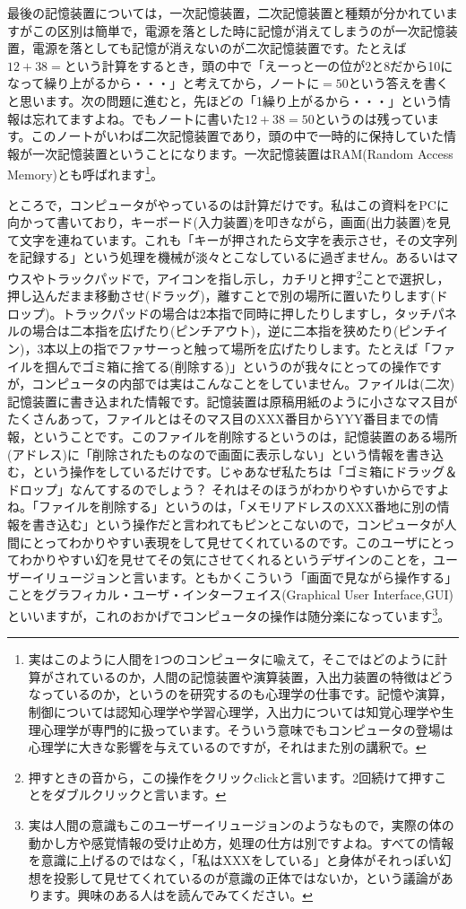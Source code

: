 \documentclass{ltjsbook}
\begin{document}
最後の記憶装置については，一次記憶装置，二次記憶装置と種類が分かれていますがこの区別は簡単で，電源を落とした時に記憶が消えてしまうのが一次記憶装置，電源を落としても記憶が消えないのが二次記憶装置です。たとえば$12+38=$という計算をするとき，頭の中で「えーっと一の位が2と8だから10になって繰り上がるから・・・」と考えてから，ノートに$=50$という答えを書くと思います。次の問題に進むと，先ほどの「1繰り上がるから・・・」という情報は忘れてますよね。でもノートに書いた$12+38=50$というのは残っています。このノートがいわば二次記憶装置であり，頭の中で一時的に保持していた情報が一次記憶装置ということになります。一次記憶装置はRAM(Random Access Memory)とも呼ばれます\footnote{実はこのように人間を1つのコンピュータに喩えて，そこではどのように計算がされているのか，人間の記憶装置や演算装置，入出力装置の特徴はどうなっているのか，というのを研究するのも心理学の仕事です。記憶や演算，制御については認知心理学や学習心理学，入出力については知覚心理学や生理心理学が専門的に扱っています。そういう意味でもコンピュータの登場は心理学に大きな影響を与えているのですが，それはまた別の講釈で。}。

ところで，コンピュータがやっているのは計算だけです。私はこの資料をPCに向かって書いており，キーボード(入力装置)を叩きながら，画面(出力装置)を見て文字を連ねています。これも「キーが押されたら文字を表示させ，その文字列を記録する」という処理を機械が淡々とこなしているに過ぎません。あるいはマウスやトラックパッドで，アイコンを指し示し，カチリと押す\footnote{押すときの音から，この操作をクリックclickと言います。2回続けて押すことをダブルクリックと言います。}ことで選択し，押し込んだまま移動させ(ドラッグ)，離すことで別の場所に置いたりします(ドロップ)。トラックパッドの場合は2本指で同時に押したりしますし，タッチパネルの場合は二本指を広げたり(ピンチアウト)，逆に二本指を狭めたり(ピンチイン)，3本以上の指でファサーっと触って場所を広げたりします。たとえば「ファイルを掴んでゴミ箱に捨てる(削除する)」というのが我々にとっての操作ですが，コンピュータの内部では実はこんなことをしていません。ファイルは(二次)記憶装置に書き込まれた情報です。記憶装置は原稿用紙のように小さなマス目がたくさんあって，ファイルとはそのマス目のXXX番目からYYY番目までの情報，ということです。このファイルを削除するというのは，記憶装置のある場所(アドレス)に「削除されたものなので画面に表示しない」という情報を書き込む，という操作をしているだけです。じゃあなぜ私たちは「ゴミ箱にドラッグ＆ドロップ」なんてするのでしょう？ それはそのほうがわかりやすいからですよね。「ファイルを削除する」というのは，「メモリアドレスのXXX番地に別の情報を書き込む」という操作だと言われてもピンとこないので，コンピュータが人間にとってわかりやすい表現をして見せてくれているのです。このユーザにとってわかりやすい幻を見せてその気にさせてくれるというデザインのことを，ユーザーイリュージョンと言います。ともかくこういう「画面で見ながら操作する」ことをグラフィカル・ユーザ・インターフェイス(Graphical User Interface,GUI)といいますが，これのおかげでコンピュータの操作は随分楽になっています\footnote{実は人間の意識もこのユーザーイリュージョンのようなもので，実際の体の動かし方や感覚情報の受け止め方，処理の仕方は別ですよね。すべての情報を意識に上げるのではなく，「私はXXXをしている」と身体がそれっぽい幻想を投影して見せてくれているのが意識の正体ではないか，という議論があります。興味のある人は\citet{トールノーレットランダーシュ2002}を読んでみてください。}。
\end{document}
